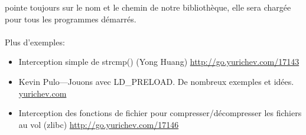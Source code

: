 pointe toujours sur le nom et le chemin de notre bibliothèque,
elle sera chargée pour tous les programmes démarrés. \\
\\
Plus d'exemples:

\begin{itemize}

\item
Interception simple de strcmp() (Yong Huang)
\url{http://go.yurichev.com/17143}

\item
Kevin Pulo---Jouons avec LD\_PRELOAD. De nombreux exemples et idées.
\href{http://go.yurichev.com/17145}{yurichev.com}

\item
Interception des fonctions de fichier pour compresser/décompresser les fichiers au vol (zlibc) \url{http://go.yurichev.com/17146}

\end{itemize}
